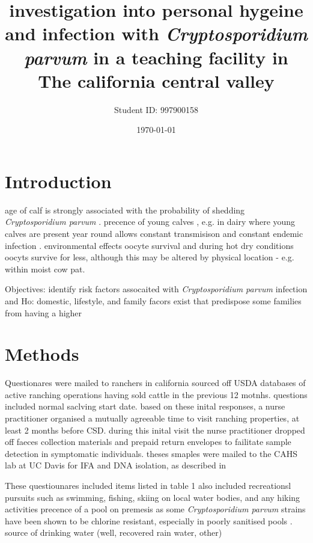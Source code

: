 \documentclass[12pt]{article}
\title{investigation into personal hygeine and infection with \emph{Cryptosporidium parvum} in a teaching facility in The california central valley}
\author{Student ID: 997900158}
\date{\today}
\begin{document}
	\maketitle
	\begin{abstract}


	\end{abstract}


	\section{Introduction} 
	age of calf is strongly associated with the probability of shedding \emph{Cryptosporidium parvum} \cite{Atwill1999a}.
	precence of young calves , e.g. in dairy where young calves are present year round allows constant transmisison and constant endemic infection .\cite{Atwill1998}
	environmental effects oocyte survival and 
	during hot dry conditions oocyts survive for less, although this may be altered by physical location - e.g. within moist cow pat. \cite{Robertson1992}
		
	Objectives: identify risk factors assocaited with \emph{Cryptosporidium parvum} infection and
	Ho: domestic, lifestyle, and family facors exist that predispose some families from having a higher 
 		
	\section{Methods} 
		Questionares were mailed to ranchers in california sourced off USDA databases of active ranching operations having sold cattle in the previous 12 motnhs.
		questions included normal saclving start date.
		based on these inital responses, a nurse practitioner organised a mutually agreeable time to visit ranching properties, at least 2 months before CSD.	%
	during this inital visit the nurse practitioner dropped off faeces collection materials and prepaid return envelopes to failitate sample detection in symptomatic individuals.		%
		theses smaples were mailed to the CAHS lab at UC Davis for IFA and DNA isolation,  as described in \cite{Atwill1999}

		These questiounares included items listed in table 1
		also included recreationsl pursuits such as swimming, fishing, skiing on local water bodies, and any hiking activities 
		precence of a pool on premesis as some \emph{Cryptosporidium parvum} strains have been shown to be chlorine resistant, especially in poorly sanitised pools \cite{Carpenter1999}.
		source of drinking water (well, recovered rain water, other)
\end{document}
